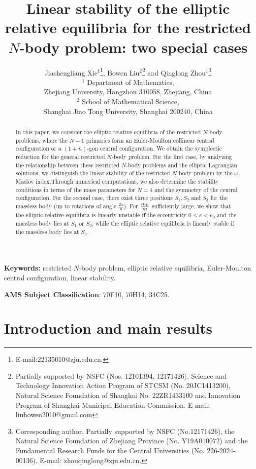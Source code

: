 \documentclass[11pt]{article}
\title{Linear stability of the elliptic relative equilibria for the restricted $N$-body problem: two special cases}
\author{Jiashengliang Xie$^{1}$\thanks{E-mail:22135010@zju.edu.cn.},\quad
	Bowen Liu$^{2}$\thanks{Partially supported by NSFC (Nos. {12101394,  12171426}), Science and Technology Innovation Action Program of  STCSM (No. 20JC1413200), Natural Science Foundation of Shanghai No. 22ZR1433100	and Innovation Program of Shanghai Municipal Education Commission. E-mail: liubowen2010@gmail.com} \quad and \quad
	Qinglong Zhou$^{1}$\thanks{Corresponding author. Partially supported by NSFC (No.12171426), the Natural Science Foundation of Zhejiang Province (No. Y19A010072) and the Fundamental Research Funds for the Central Universities (No. 226-2024-00136).
		E-mail: zhouqinglong@zju.edu.cn. }\\	
	$^{1}$ Department of Mathematics,\\Zhejiang University, Hangzhou 310058, Zhejiang, China\\
	$^{2}$ School of Mathematical Science,\\ Shanghai Jiao Tong University, Shanghai 200240, China\\
}
\date{}
\def\om{{\omega}}
\begin{document}
\maketitle


\begin{abstract}
In this paper, we consider the elliptic relative equilibria of the restricted $N$-body problems, where
the $N-1$ primaries form an Euler-Moulton collinear central configuration 
or a $(1+n)$-gon central configuration. 
We obtain the symplectic reduction for the general restricted $N$-body problem. 
For the first case,
by analyzing the relationship between these restricted $N$-body problems and the elliptic Lagrangian solutions, we distinguish the linear stability of the restricted $N$-body problem by the $\om$-Maslov index.Through numerical computations, we also determine the stability conditions in terms of the mass parameters for \(N=4\) and the symmetry of the central configuration.
For the second case,
there exist three positions
$S_1,S_2$ and $S_3$
for the massless body (up to rotations of angle $\frac{2\pi}{n}$).
For ${m_0\over m}$ sufficiently large,
we show that the elliptic relative equilibria
is linearly unstable if the eccentricity $0\le e<e_0$ and the massless body lies at $S_1$ or $S_2$;
while the elliptic relative equilibria
is linearly stable if the massless body lies at $S_3$.
\end{abstract}

{\bf Keywords:} restricted $N$-body problem, elliptic relative equilibria, Euler-Moulton central configuration, linear stability.

{\bf AMS Subject Classification}: 70F10, 70H14, 34C25.


\renewcommand{\theequation}{\thesection.\arabic{equation}}


\setcounter{equation}{0}%
\section{Introduction and main results}%
\label{sec:1}
\end{document}
